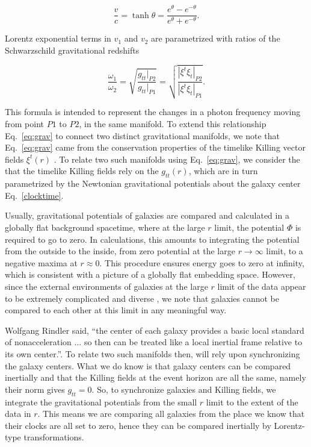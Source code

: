 \documentclass[reprint,%
 amsmath,amssymb,
 aps,
]{revtex4-1}
\begin{document}
     \begin{equation}
         \frac{v}{c} = \tanh \theta = \frac{e^\theta - e^{-\theta}}{e^\theta + e^{-\theta}} .   
         \label{boost}
     \end{equation} 

 
 
 
 
 
Lorentz exponential terms in  $v_1$ and $v_2$ are parametrized with ratios of  the    Schwarzschild gravitational redshifts

\begin{equation}
       \frac{\omega_1}{\omega_2}  =\sqrt{\frac{g_{tt}|_{P2}}{g_{tt}|_{P1}}} =\sqrt{\frac{|\xi^t\xi_{t}|_{P2}}{|\xi^t\xi_{t}|_{P1}}}.
      \label{eq:grav}
    \end{equation} 
    
    This formula is    intended to represent the changes in a photon frequency moving from point $P1$ to $P2$,  in the same manifold. 
To extend this relationship Eq.~\ref{eq:grav} to connect 
  two distinct gravitational manifolds,  we    note that Eq.~\ref{eq:grav} came from  the conservation properties of  the timelike  Killing vector fields  
   $\xi^t(r)$  \cite{Wald}.   
   To relate two such manifolds using Eq.~\ref{eq:grav}, we consider the that 
 the  timelike Killing fields rely on  the
  $g_{tt}(r)$, 
  which are in  turn   parametrized by  the Newtonian  gravitational potentials about the galaxy center Eq.~\ref{clocktime}. 
  
 
   
 Usually, gravitational potentials of galaxies are compared and calculated in  a globally flat background spacetime, where at the large $r$ limit, the potential $\Phi$ is required  to go to zero. 
 In calculations, this amounts to integrating the potential from the outside to the inside, from zero potential at the large  $r \to \infty$ limit, to a negative maxima at   $r\approx 0$. 
This procedure  ensures   energy goes to zero at infinity, which is consistent with a picture of a globally flat embedding space.   However, since 
  the external environments of galaxies at the large $r$  limit of the data appear to be  extremely complicated  and diverse  \cite{Pomarede:2020pme,Hoffman:2017ako},   we 
  note that  galaxies cannot be compared to each other at this limit in any meaningful way.

  Wolfgang Rindler said,        ``the center of each galaxy provides a basic local standard of nonacceleration ... so then can be treated like a local inertial frame relative to its own center.''\cite{rindler2013essential}. To relate two such manifolds then, will rely upon synchronizing the galaxy centers. 
  What we do know is that galaxy centers can be compared inertially and that the Killing fields at the event horizon are all the same, namely their norm gives $g_{tt} = 0$. 
 So,  to synchronize galaxies and Killing fields, we   integrate the gravitational potentials from the small $r$ limit to the extent of the data in $r$. This means we are comparing all galaxies from the place we know that their clocks are all set to zero, hence they can be compared inertially by Lorentz-type transformations. 
   
\end{document}

